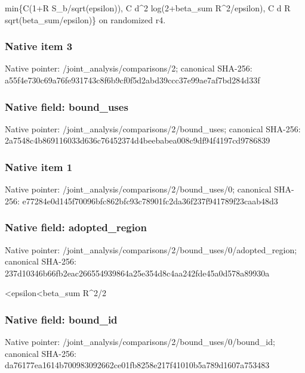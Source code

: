 \documentclass[10pt,a4paper]{article}
\begin{document}
\begingroup\raggedright\sloppy min\{C(1+R S\_\allowbreak{}b/\allowbreak{}sqrt(epsilon)),\allowbreak{} C d\textasciicircum{}2 log(2+beta\_\allowbreak{}sum R\textasciicircum{}2/\allowbreak{}epsilon),\allowbreak{} C d R sqrt(beta\_\allowbreak{}sum/\allowbreak{}epsilon)\} on randomized r4.\par\endgroup

\subsubsection{Native item 3}
Native pointer: /joint\_\allowbreak{}analysis/comparisons/2; canonical SHA-256: a55f4e730c69a76fe931743c8f6b9cf0f5d2abd39ccc37e99ae7af7bd284d33f

\subsubsection{Native field: bound\_\allowbreak{}uses}
Native pointer: /joint\_\allowbreak{}analysis/comparisons/2/bound\_\allowbreak{}uses; canonical SHA-256: 2a7548c4b869116033d636c76452374d4beebabea008c9df94f4197cd9786839

\subsubsection{Native item 1}
Native pointer: /joint\_\allowbreak{}analysis/comparisons/2/bound\_\allowbreak{}uses/0; canonical SHA-256: e77284e0d145f70096bfc862bfc93c78901fc2da36f237f941789f23caab48d3

\subsubsection{Native field: adopted\_\allowbreak{}region}
Native pointer: /joint\_\allowbreak{}analysis/comparisons/2/bound\_\allowbreak{}uses/0/adopted\_\allowbreak{}region; canonical SHA-256: 237d10346b66fb2eac266554939864a25e354d8c4aa242fde45a0d578a89930a

\begingroup\raggedright{}<epsilon<beta\_\allowbreak{}sum R\textasciicircum{}2/\allowbreak{}2\par\endgroup

\subsubsection{Native field: bound\_\allowbreak{}id}
Native pointer: /joint\_\allowbreak{}analysis/comparisons/2/bound\_\allowbreak{}uses/0/bound\_\allowbreak{}id; canonical SHA-256: da76177ea1614b700983092662ce01fb8258e217f41010b5a789d1607a753483
\end{document}
